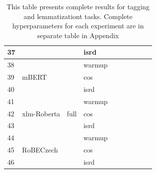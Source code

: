 \begin{table}
{\begin{tabular}{|l|l|l|l||llllll|}
37 &                              &                         & isrd   &        &         &         &          &           &            \\ \hline
38 & \multirow{3}{*}{mBERT}       & \multirow{9}{*}{full}   & warmup &        &         &         &          &           &            \\ \cline{1-1} \cline{4-10} 
39 &                              &                         & cos    &        &         &         &          &           &            \\ \cline{1-1} \cline{4-10} 
40 &                              &                         & isrd   &        &         &         &          &           &            \\ \cline{1-2} \cline{4-10} 
41 & \multirow{3}{*}{xlm-Roberta} &                         & warmup &        &         &         &          &           &            \\ \cline{1-1} \cline{4-10} 
42 &                              &                         & cos    &        &         &         &          &           &            \\ \cline{1-1} \cline{4-10} 
43 &                              &                         & isrd   &        &         &         &          &           &            \\ \cline{1-2} \cline{4-10} 
44 & \multirow{3}{*}{RoBECzech}   &                         & warmup &        &         &         &          &           &            \\ \cline{1-1} \cline{4-10} 
45 &                              &                         & cos    &        &         &         &          &           &            \\ \cline{1-1} \cline{4-10} 
46 &                              &                         & isrd   &        &         &         &          &           &            \\ \hline
\end{tabular}
}
\label{tab:all_res_tl}
\caption{This table presents complete results for tagging and lemmatizationt tasks.  Complete hyperparameters for each experiment are in separate table in Appendix %
}
\end{table}

